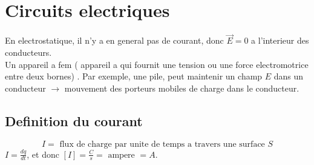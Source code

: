 \documentclass[../main.tex]{subfiles}
\begin{document}
\section{Circuits electriques }
En electrostatique, il n'y a en general pas de courant, donc $\vec{E}=0$ a l'interieur des conducteurs.\\
Un appareil a fem ( appareil a qui fournit une tension ou une force electromotrice entre deux bornes) . 
Par exemple, une pile,  peut maintenir un champ $E$ dans un conducteur $ \to$ mouvement des porteurs mobiles de charge dans le conducteur.
\subsection{Definition du courant}
\[ 
I = \text{ flux de charge par unite de temps a travers une surface  } S
\]
$I = \frac{dq}{dt}$, et donc $ [ I] = \frac{C}{s}= \text{ ampere } = A$.\\
\end{document}
